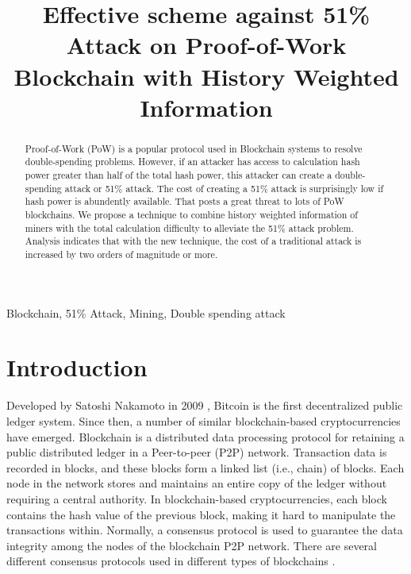 \documentclass[conference]{IEEEtran}
\begin{document}
\title{Effective scheme against 51\% Attack on Proof-of-Work Blockchain with History Weighted Information\\
}

\author{
}

\maketitle

\begin{abstract}
Proof-of-Work (PoW) is a popular protocol used in Blockchain systems to resolve double-spending problems. However, if an attacker has access to calculation hash power greater than half of the total hash power, this attacker can create a double-spending attack or 51\% attack. The cost of creating a 51\% attack is surprisingly low if hash power is abundently available. That posts a great threat to lots of PoW blockchains. We propose a technique to combine history weighted information of miners with the total calculation difficulty to alleviate the 51\% attack problem. Analysis indicates that with the new technique, the cost of a traditional attack is increased by two orders of magnitude or more.
\end{abstract}


\begin{IEEEkeywords}
Blockchain, 51\% Attack, Mining, Double spending attack
\end{IEEEkeywords}

\section{Introduction}
Developed by Satoshi Nakamoto in 2009 \cite{b1}, Bitcoin is the first decentralized public ledger system. Since then, a number of similar blockchain-based cryptocurrencies have emerged. Blockchain is a distributed data processing protocol for retaining a public distributed ledger in a Peer-to-peer (P2P) network. Transaction data is recorded in blocks, and these blocks form a linked list (i.e., chain) of blocks. Each node in the network stores and maintains an entire copy of the ledger without requiring a central authority. In blockchain-based cryptocurrencies, each block contains the hash value of the previous block, making it hard to manipulate the transactions within. Normally, a consensus protocol is used to guarantee the data integrity among the nodes of the blockchain P2P network. There are several different consensus protocols used in different types of blockchains \cite{b2}.
\end{document}
